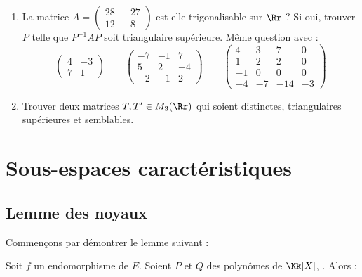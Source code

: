 \documentclass[12pt, class=report,crop=false]{standalone}
\begin{document}
 
\begin{miniexercices}
\sauteligne
\begin{enumerate}
  \item La matrice 
  $A = \left(\begin{smallmatrix}
  28 & -27 \\ 12 & -8
  \end{smallmatrix}\right)$ 
  est-elle trigonalisable sur $\Rr$ ? Si oui, trouver $P$ telle que 
  $P^{-1}AP$ soit triangulaire supérieure. 
  Même question avec :
$$\left(\begin{smallmatrix}
4 & -3 \\ 7 & 1
\end{smallmatrix}\right) \qquad
\left(\begin{smallmatrix}
-7 & -1 & 7 \\ 5 & 2 & -4 \\ -2 & -1 & 2
\end{smallmatrix}\right) \qquad
\left(\begin{smallmatrix}
4 & 3 & 7 & 0 \\
1 & 2 & 2 & 0 \\
-1 & 0 & 0 & 0 \\
-4 & -7 & -14 & -3
\end{smallmatrix}\right)$$  
   
  \item Trouver deux matrices $T, T' \in M_3(\Rr)$  qui soient distinctes, triangulaires supérieures et semblables.
  
\end{enumerate}
\end{miniexercices}




\section{Sous-espaces caractéristiques}


\subsection{Lemme des noyaux}

Commençons par démontrer le lemme suivant :

\begin{lemme}
Soit $f$ un endomorphisme de $E$.
Soient $P$ et $Q$ des polynômes de $\Kk[X]$, . Alors :
\end{lemme}
 
\end{document}

